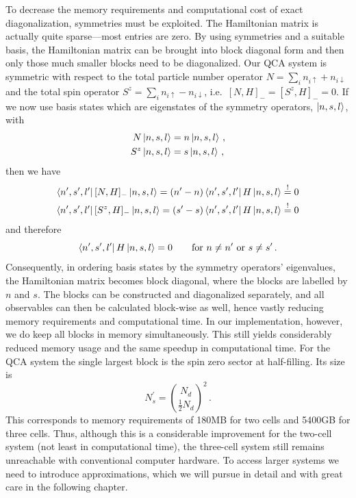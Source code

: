 %
To decrease the memory requirements and computational cost of exact
diagonalization, symmetries must be exploited. The Hamiltonian matrix is
actually quite sparse---most entries are zero. By using symmetries and a
suitable basis, the Hamiltonian matrix can be brought into block diagonal form
and then only those much smaller blocks need to be diagonalized. Our QCA system
is symmetric with respect to the total particle number operator $N = \sum_i
n_{i\uparrow} + n_{i\downarrow}$ and the total spin operator $S^z = \sum_i
n_{i\uparrow} - n_{i\downarrow}$, i.e.\ $[N,H]_- = [S^z,H]_- = 0$. If we now use
basis states which are eigenstates of the symmetry operators, $\left|n,s,l\right>$,
with
%
\begin{equation}
\begin{split}
  N \left|n,s,l\right> &= n \left|n,s,l\right> \, , \\
  S^z \left|n,s,l\right> &= s \left|n,s,l\right> \, ,
\end{split}
\end{equation}
%
then we have
%
\begin{equation}
\begin{split}
  \left<n^{\prime},s^{\prime},l^{\prime}\right| [N,H]_- \left|n,s,l\right> = 
  (n^{\prime} - n) \left<n^{\prime},s^{\prime},l^{\prime}\right| H \left|n,s,l\right>
  \stackrel{!}{=} 0 \\
  \left<n^{\prime},s^{\prime},l^{\prime}\right| [S^z,H]_- \left|n,s,l\right> = 
  (s^{\prime} - s) \left<n^{\prime},s^{\prime},l^{\prime}\right| H \left|n,s,l\right>
  \stackrel{!}{=} 0
\end{split}
\end{equation}
%
and therefore
%
\begin{equation}
  \left<n^{\prime},s^{\prime},l^{\prime}\right| H \left|n,s,l\right> = 0 \qquad
  \textrm{for } n \ne n^{\prime} \textrm{ or } s \ne s^{\prime} \, .
\end{equation}
%
Consequently, in ordering basis states by the symmetry operators' eigenvalues,
the Hamiltonian matrix becomes block diagonal, where the blocks are labelled by
$n$ and $s$. The blocks can be constructed and diagonalized separately, and all
observables can then be calculated block-wise as well, hence vastly reducing
memory requirements and computational time. In our implementation, however, we
do keep all blocks in memory simultaneously. This still yields considerably
reduced memory usage and the same speedup in computational time. For the QCA system
the single largest block is the spin zero sector at half-filling. Its size is
%
\begin{equation}
  N_s^{\prime} = \binom{N_d}{\frac{1}{2} N_d}^2 \, .
\end{equation}
%
This corresponds to memory requirements of 180MB for two cells and 5400GB for
three cells. Thus, although this is a considerable improvement for the two-cell
system (not least in computational time), the three-cell system still remains
unreachable with conventional computer hardware. To access larger systems we
need to introduce approximations, which we will pursue in detail and with great
care in the following chapter.

